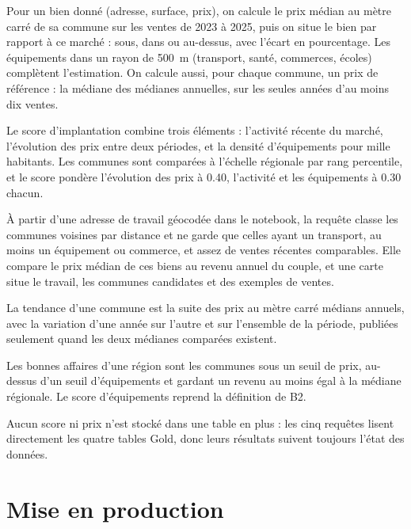\documentclass[11pt,a4paper]{article}
\begin{document}
\begin{description}[leftmargin=1.2cm,style=nextline]
  \item[B1.] Pour un bien donné (adresse, surface, prix), on calcule le prix médian au mètre carré de sa commune sur les ventes de 2023 à 2025, puis on situe le bien par rapport à ce marché : sous, dans ou au-dessus, avec l'écart en pourcentage. Les équipements dans un rayon de 500~m (transport, santé, commerces, écoles) complètent l'estimation. On calcule aussi, pour chaque commune, un prix de référence : la médiane des médianes annuelles, sur les seules années d'au moins dix ventes.
  \item[B2.] Le score d'implantation combine trois éléments : l'activité récente du marché, l'évolution des prix entre deux périodes, et la densité d'équipements pour mille habitants. Les communes sont comparées à l'échelle régionale par rang percentile, et le score pondère l'évolution des prix à \num{0.40}, l'activité et les équipements à \num{0.30} chacun.
  \item[B3.] À partir d'une adresse de travail géocodée dans le notebook, la requête classe les communes voisines par distance et ne garde que celles ayant un transport, au moins un équipement ou commerce, et assez de ventes récentes comparables. Elle compare le prix médian de ces biens au revenu annuel du couple, et une carte situe le travail, les communes candidates et des exemples de ventes.
  \item[B4.] La tendance d'une commune est la suite des prix au mètre carré médians annuels, avec la variation d'une année sur l'autre et sur l'ensemble de la période, publiées seulement quand les deux médianes comparées existent.
  \item[B5.] Les bonnes affaires d'une région sont les communes sous un seuil de prix, au-dessus d'un seuil d'équipements et gardant un revenu au moins égal à la médiane régionale. Le score d'équipements reprend la définition de B2.
\end{description}

Aucun score ni prix n'est stocké dans une table en plus : les cinq requêtes lisent directement les quatre tables Gold, donc leurs résultats suivent toujours l'état des données.

\section{Mise en production}
\end{document}
